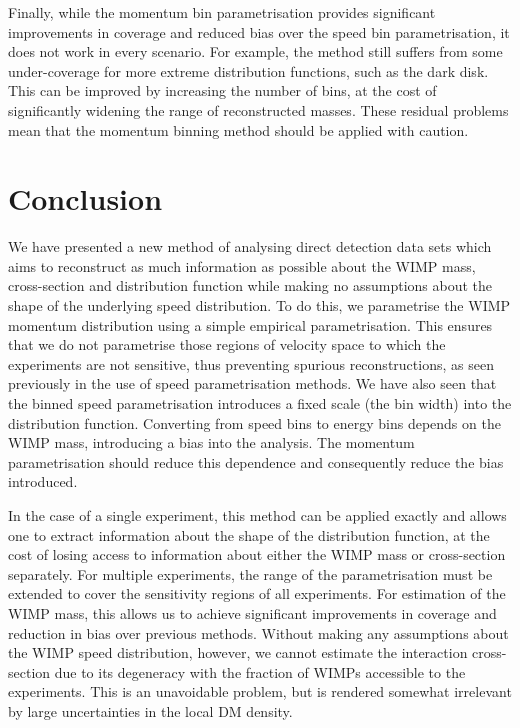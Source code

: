 

Finally, while the momentum bin parametrisation provides significant improvements in coverage and reduced bias over the speed bin parametrisation, it does not work in every scenario. For example, the method still suffers from some under-coverage for more extreme distribution functions, such as the dark disk. This can be improved by increasing the number of bins, at the cost of significantly widening the range of reconstructed masses. These residual problems mean that the momentum binning method should be applied with caution. 

\section{Conclusion}
\label{sec:Speed:Conclusion}

We have presented a new method of analysing direct detection data sets which aims to reconstruct as much information as possible about the WIMP mass, cross-section and distribution function while making no assumptions about the shape of the underlying speed distribution. To do this, we parametrise the WIMP momentum distribution using a simple empirical parametrisation. This ensures that we do not parametrise those regions of velocity space to which the experiments are not sensitive, thus preventing spurious reconstructions, as seen previously in the use of speed parametrisation methods. We have also seen that the binned speed parametrisation introduces a fixed scale (the bin width) into the distribution function. Converting from speed bins to energy bins depends on the WIMP mass, introducing a bias into the analysis. The momentum parametrisation should reduce this dependence and consequently reduce the bias introduced. 

In the case of a single experiment, this method can be applied exactly and allows one to extract information about the shape of the distribution function, at the cost of losing access to information about either the WIMP mass or cross-section separately. For multiple experiments, the range of the parametrisation must be extended to cover the sensitivity regions of all experiments. For estimation of the WIMP mass, this allows us to achieve significant improvements in coverage and reduction in bias over previous methods. Without making any assumptions about the WIMP speed distribution, however, we cannot estimate the interaction cross-section due to its degeneracy with the fraction of WIMPs accessible to the experiments. This is an unavoidable problem, but is rendered somewhat irrelevant by large uncertainties in the local DM density.

